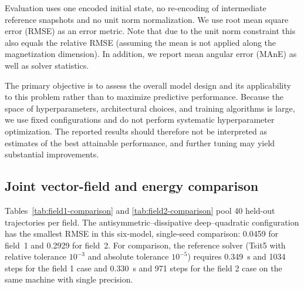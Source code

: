 \documentclass[a4paper,11pt]{article}
\begin{document}
Evaluation uses one encoded initial state, no re-encoding of intermediate reference snapshots and no unit norm normalization. We use root mean square error (RMSE) as an error metric. Note that due to the unit norm constraint this also equals the relative RMSE (assuming the mean is not applied along the magnetization dimension). In addition, we report mean angular error (MAnE) as well as solver statistics.

The primary objective is to assess the overall model design and its applicability to this problem rather than to maximize predictive performance. Because the space of hyperparameters, architectural choices, and training algorithms is large, we use fixed configurations and do not perform systematic hyperparameter optimization. The reported results should therefore not be interpreted as estimates of the best attainable performance, and further tuning may yield substantial improvements.

\subsection{Joint vector-field and energy comparison}
Tables~\ref{tab:field1-comparison} and \ref{tab:field2-comparison} pool 40 held-out trajectories per field. The antisymmetric--dissipative deep--quadratic configuration has the smallest RMSE in this six-model, single-seed comparison: 0.0459 for field~1 and 0.2929 for field~2. For comparison, the reference solver (Tsit5 with relative tolerance $10^{-3}$ and absolute tolerance $10^{-5}$) requires \SI{0.349}{s} and \num{1034} steps for the field 1 case and \SI{0.330}{s} and \num{971} steps for the field 2 case on the same machine with single precision.
\end{document}
